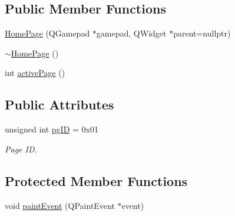\subsection*{Public Member Functions}
\begin{DoxyCompactItemize}
\item 
\mbox{\hyperlink{classHomePage_a5a47924673356c09cc9269511e07fdf2}{Home\+Page}} (Q\+Gamepad $\ast$gamepad, Q\+Widget $\ast$parent=nullptr)
\item 
\mbox{\hyperlink{classHomePage_aff8e741021104752949c6935c7407f90}{$\sim$\+Home\+Page}} ()
\item 
int \mbox{\hyperlink{classHomePage_a0b6a91525a77e5ea66505666f7ba7c8d}{active\+Page}} ()
\end{DoxyCompactItemize}
\subsection*{Public Attributes}
\begin{DoxyCompactItemize}
\item 
unsigned int \mbox{\hyperlink{classHomePage_ac9959d1707d1b0a4dcbcff018a46b2a9}{pg\+ID}} = 0x01
\begin{DoxyCompactList}\small\item\em Page ID. \end{DoxyCompactList}\end{DoxyCompactItemize}
\subsection*{Protected Member Functions}
\begin{DoxyCompactItemize}
\item 
void \mbox{\hyperlink{classHomePage_ab3daab17f753e46efcec8968333f88b5}{paint\+Event}} (Q\+Paint\+Event $\ast$event)
\end{DoxyCompactItemize}
